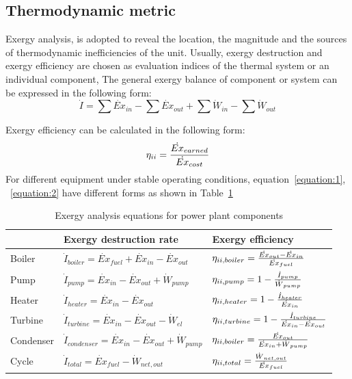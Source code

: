 \documentclass[preprint,12pt]{elsarticle}
\begin{document}
\subsection{Thermodynamic metric} %
\label{ssub3:analsys method} 
Exergy analysis, is adopted to reveal the location, the magnitude and the sources of thermodynamic inefficiencies of the unit.
Usually, exergy destruction and exergy efficiency are chosen as evaluation indices of the thermal system or an individual component, 
The general exergy balance of component or system can be expressed in the following form:
\begin{equation}
\label{equation:1}
\dot{I}=\sum\dot{Ex}{}_{in}-\sum\dot{Ex}{}_{out}+\sum\dot{W}{}_{in}-\sum\dot{W}{}_{out}
\end{equation}





Exergy efficiency can be calculated in the following form:
\begin{equation}
\label{equation:2}
\eta_{\uppercase\expandafter{\romannumeral2}}=\frac{\dot{Ex}{}_{earned}}{\dot{Ex}{}_{cost}}
\end{equation}
For different equipment under stable operating conditions, equation~\ref{equation:1}, ~\ref{equation:2} have different forms as shown in Table~\ref{tab:exergy equation}~\cite{Aljundi2009Energy}

\begin{table}
\caption{Exergy analysis equations for power plant components}
\label{tab:exergy equation}
\centering
\begin{tabular}{lll}
\toprule 
 & Exergy destruction rate  & Exergy efficiency\tabularnewline
\midrule
Boiler & $\dot{I}_{boiler}=\dot{Ex}{}_{fuel}+\dot{Ex}{}_{in}-\dot{Ex}{}_{out}$ & $\eta_{\uppercase\expandafter{\romannumeral2},boiler}=\frac{\dot{Ex}{}_{out}-\dot{Ex}{}_{in}}{\dot{Ex}{}_{fuel}}$\tabularnewline
Pump & $\dot{I}_{pump}=\dot{Ex}{}_{in}-\dot{Ex}{}_{out}+\dot{W}{}_{pump}$ & $\eta_{\uppercase\expandafter{\romannumeral2},pump}=1-\frac{\dot{I}_{pump}}{\dot{W}{}_{pump}}$\tabularnewline
Heater & $\dot{I}_{heater}=\dot{Ex}{}_{in}-\dot{Ex}{}_{out}$ & $\eta_{\uppercase\expandafter{\romannumeral2},heater}=1-\frac{\dot{I}_{heater}}{\dot{Ex}{}_{in}}$\tabularnewline
Turbine & $\dot{I}_{turbine}=\dot{Ex}{}_{in}-\dot{Ex}{}_{out}-\dot{W}{}_{el}$ & $\eta_{\uppercase\expandafter{\romannumeral2},turbine}=1-\frac{\dot{I}_{turbine}}{\dot{Ex}{}_{in}-\dot{Ex}{}_{out}}$\tabularnewline
Condenser & $\dot{I}_{condenser}=\dot{Ex}{}_{in}-\dot{Ex}{}_{out}+\dot{W}{}_{pump}$ & $\eta_{\uppercase\expandafter{\romannumeral2},boiler}=\frac{\dot{Ex}{}_{out}}{\dot{Ex}{}_{in}+\dot{W}{}_{pump}}$\tabularnewline
Cycle &$\dot{I}_{total}=\dot{Ex}{}_{fuel}-\dot{W}{}_{net,out}$ & $\eta_{\uppercase\expandafter{\romannumeral2},total}=\frac{\dot{W}{}_{net,out}}{\dot{Ex}{}_{fuel}}$\tabularnewline
\bottomrule
\end{tabular}
\end{table}
\end{document}
